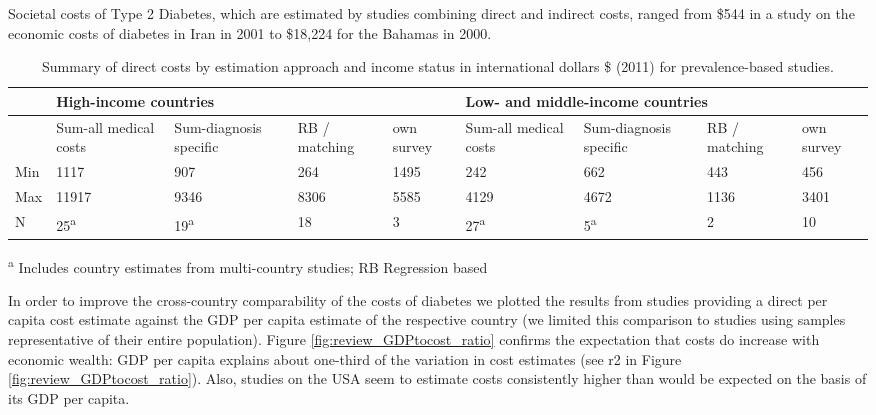 \documentclass[12pt,english]{article}
\begin{document}
Societal costs of Type 2 Diabetes, which are estimated by studies combining direct and indirect costs, ranged from \$544 in a study on the economic costs of diabetes in Iran \parencite{Esteghamati2009} in 2001 to \$18,224 for the Bahamas \parencite{Barcelo2003} in 2000. 

\begin{table}[h]
\begin{center}

\begin{threeparttable}
\begin{tabularx}{\textwidth}{X X X X X X X X X}
\caption{\label{tab:review_direct_costs_summary}Summary of direct costs by estimation approach and income status in international dollars \$ (2011) for prevalence-based studies.}\\
\toprule
& \multicolumn{4}{l}{High-income countries} & \multicolumn{4}{l}{Low- and middle-income countries} \\ \midrule
 & Sum-all medical costs & Sum-diagnosis specific & RB / matching & own survey & Sum-all medical costs & Sum-diagnosis specific & RB / matching & own survey \\ \midrule \endhead
Min & 1117 & 907 & 264 & 1495 & 242 & 662 & 443 & 456 \\
Max & 11917 & 9346 & 8306 & 5585 & 4129 & 4672 & 1136 & 3401 \\
N & 25\textsuperscript{a} & 19\textsuperscript{a} & 18 & 3 & 27\textsuperscript{a} & 5\textsuperscript{a} & 2 & 10\\
 \bottomrule
\end{tabularx}
\begin{tablenotes}
\item \textsuperscript{a} Includes country estimates from multi-country studies; RB Regression based
\end{tablenotes}
\end{threeparttable}
\end{center}
\end{table}


In order to improve the cross-country comparability of the costs of diabetes we plotted the results from studies providing a direct per capita cost estimate against the \ac{GDP} per capita estimate of the respective country (we limited this comparison to studies using samples representative of their entire population). Figure \ref{fig:review_GDPtocost_ratio} confirms the expectation that costs do increase with economic wealth: \ac{GDP} per capita explains about one-third of the variation in cost estimates (see r2 in Figure \ref{fig:review_GDPtocost_ratio}). Also, studies on the USA seem to estimate costs consistently higher than would be expected on the basis of its \ac{GDP} per capita. 
\end{document}
